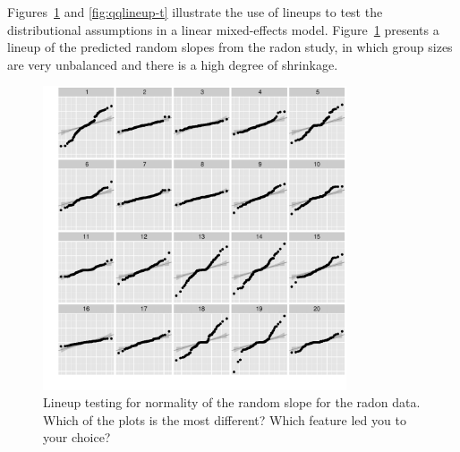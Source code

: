 \documentclass[12pt]{article} %
\begin{document}
Figures~\ref{fig:qqlineup-1} and \ref{fig:qqlineup-t} illustrate the use of lineups to test the distributional assumptions in a linear mixed-effects model. Figure~\ref{fig:qqlineup-1} presents a lineup of the predicted random slopes from the radon study, in which group sizes are very unbalanced and there is a high degree of shrinkage.
\begin{figure}[hbt]
	\centering
	\includegraphics[width=0.8\textwidth]{radonqqb2-3-10.pdf}
	\caption{\label{fig:qqlineup-1}
	Lineup testing  for normality of the random slope for the radon data. Which of the plots is the most different? Which feature led you to your choice? }
\end{figure}
\end{document}
